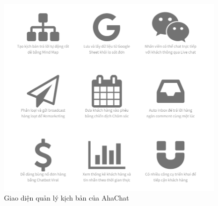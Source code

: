 \begin{figure}[H]
    \centering
    \includegraphics[width=0.75\linewidth]{Images/tinhnangahachat.png}
    \vspace{0.5cm}
    \caption{Giao diện quản lý kịch bản của AhaChat}
    \label{fig:enter-label}
\end{figure}
